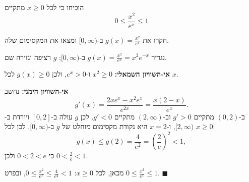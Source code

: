 
\begin{question}
הוכיחו כי לכל $x \ge 0$ מתקיים
\[ 0 \le \frac{x^2}{e^x} \le 1 \]
\end{question}

\begin{hint}
חקרו את $g(x) = \frac{x^2}{e^x}$ ב-$[0, \infty)$ ומצאו את המקסימום שלה.
\end{hint}

\begin{solution}
נגדיר $g(x) = \frac{x^2}{e^x} = x^2 e^{-x}$ ב-$[0, \infty)$; $g$ רציפה וגזירה שם.

\textbf{אי-השוויון השמאלי:} $x^2 \ge 0$ ו-$e^x > 0$, ולכן $g(x) \ge 0$ לכל $x$.

\textbf{אי-השוויון הימני:} נחשב
\[ g'(x) = \frac{2x e^x - x^2 e^x}{e^{2x}} = \frac{x(2 - x)}{e^x}. \]
ב-$(0, 2)$ מתקיים $g' > 0$ וב-$(2, \infty)$ מתקיים $g' < 0$. לכן $g$ עולה ב-$[0, 2]$ ויורדת ב-$[2, \infty)$, ו-$x = 2$ היא נקודת מקסימום מוחלט של $g$ ב-$[0, \infty)$. לכן לכל $x \ge 0$:
\[ g(x) \le g(2) = \frac{4}{e^2} = \left( \frac{2}{e} \right)^2 < 1, \]
כי $0 < 2 < e$ ולכן $0 < \frac{2}{e} < 1$.

מכאן, לכל $x \ge 0$: $0 \le \frac{x^2}{e^x} \le \frac{4}{e^2} < 1$, ובפרט $0 \le \frac{x^2}{e^x} \le 1$. $\blacksquare$
\end{solution}
